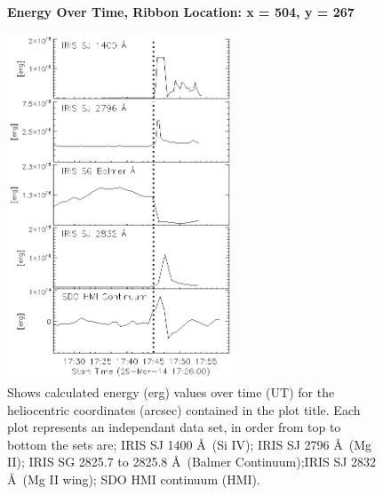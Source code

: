 \begin{figure}[H]
  \begin{center}
  \textbf{Energy Over Time, Ribbon Location: x = 504, y = 267 }\par\medskip
  \includegraphics[width=0.6\textwidth]{29-Mar-14-Ribbon-xyPosition-504-267-Frame-2-Energy-Ladder}
  \end{center}
  \caption{Shows calculated energy (erg) values over time (UT) for the heliocentric coordinates (arcsec) contained in the plot title. Each plot represents an independant data set, in order from top to bottom the sets are; IRIS SJ 1400 \AA\ (Si IV); IRIS SJ 2796 \AA\ (Mg II); IRIS SG  2825.7 to 2825.8 \AA\ (Balmer Continuum);IRIS SJ 2832 \AA\ (Mg II wing); SDO HMI continuum (HMI).}\label{erb18}
\end{figure}

